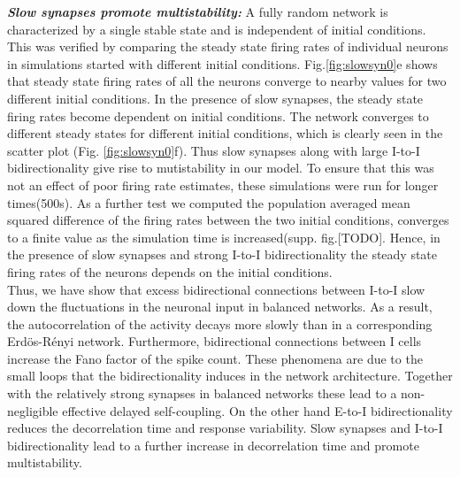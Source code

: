 \emph{\textbf{Slow synapses promote multistability:}} A fully random network is characterized by a single stable state and is independent of initial conditions. This was verified by comparing the steady state firing rates of individual neurons in simulations started with different initial conditions.  Fig.\ref{fig:slowsyn0}e shows that steady state firing rates of all the neurons converge to nearby values for two different initial conditions. In the presence of slow synapses, the steady state firing rates become dependent on initial conditions.
The network converges to different steady states for different initial conditions, which is clearly seen in the scatter plot (Fig. \ref{fig:slowsyn0}f). Thus slow synapses along with large I-to-I bidirectionality give rise to mutistability in our model. To ensure that this was not an effect of poor firing rate estimates, these simulations were run for longer times(500s). As a further test we computed the population averaged mean squared difference of the firing rates between the two initial conditions, converges to a finite value as the simulation time is increased(supp. fig.[TODO]. Hence, in the presence of slow synapses and strong I-to-I bidirectionality the steady state firing rates of the neurons depends on the initial conditions.\\

Thus, we have show that excess bidirectional connections between I-to-I slow down the fluctuations in the neuronal input in balanced networks. As a result, the autocorrelation of the activity decays more slowly than in a corresponding Erdös-Rényi network. Furthermore, bidirectional connections between I cells increase the Fano factor of the spike count. These phenomena are due to the small loops that the bidirectionality induces in the network architecture. Together with the relatively strong synapses in balanced networks these lead to a non-negligible effective delayed self-coupling. On the other hand E-to-I bidirectionality reduces the decorrelation time and response variability. Slow synapses and I-to-I bidirectionality lead to a further increase in decorrelation time and promote multistability.


